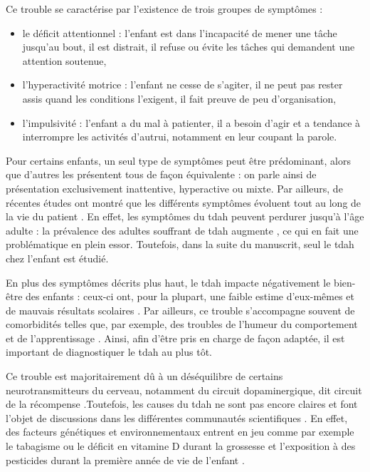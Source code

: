 Ce trouble se caractérise par l'existence de trois groupes de symptômes \citep{HAS} : 
\begin{itemize}
\item le déficit attentionnel : l'enfant est dans l'incapacité de mener une tâche jusqu'au bout, il est distrait, il refuse ou évite les tâches qui demandent
une attention soutenue,
\item l'hyperactivité motrice : l'enfant ne cesse de s'agiter, il ne peut pas rester assis quand les conditions l'exigent, il fait preuve de peu d'organisation,
\item l'impulsivité : l'enfant a du mal à patienter, il a besoin d'agir et a tendance à interrompre les activités d'autrui, notamment en leur coupant la parole.
\end{itemize}
Pour certains enfants, un seul type de symptômes peut être prédominant, alors que d'autres les présentent tous de façon équivalente \citep{DSM-5} : 
on parle ainsi de présentation exclusivement inattentive, hyperactive ou mixte. Par ailleurs, de récentes 
études ont montré que les différents symptômes évoluent tout au long de la vie du patient \citep{CFDCAP, Epstein2013}. En effet, les symptômes du \gls{tdah}
peuvent perdurer jusqu'à l'âge adulte \citep{Faraone2006} : la prévalence des adultes souffrant de \gls{tdah} augmente \citep{Chung2019, Weibel2019}, 
ce qui en fait une problématique en plein essor. Toutefois, dans la suite du manuscrit, seul le \gls{tdah} chez l'enfant est étudié. 

En plus des symptômes décrits plus haut, le \gls{tdah} impacte négativement le bien-être des enfants : ceux-ci ont, pour la plupart, une faible estime d'eux-mêmes 
\citep{Shaw2005} et de mauvais résultats scolaires \citep{Barry2002}. Par ailleurs, ce trouble s'accompagne souvent de comorbidités telles que, par exemple, 
des troubles de l'humeur du comportement et de l'apprentissage \citep{Monastra2005}. Ainsi, afin d'être pris en charge de façon adaptée, il est 
important de diagnostiquer le \gls{tdah} au plus tôt. 

Ce trouble est majoritairement dû à un déséquilibre de certains neurotransmitteurs du cerveau, notamment du circuit dopaminergique, 
dit circuit de la récompense \citep{Daley2010, Punja2016}.Toutefois, les causes du \gls{tdah} ne sont pas encore claires et font l'objet de discussions
dans les différentes communautés scientifiques \citep{Galera2014}. En effet, des facteurs génétiques et environnementaux entrent en jeu comme par exemple le tabagisme ou le déficit en
vitamine D durant la grossesse et l'exposition à des pesticides durant la première année de vie de l'enfant \citep{Galera2014, Sucksdorff2019}.

